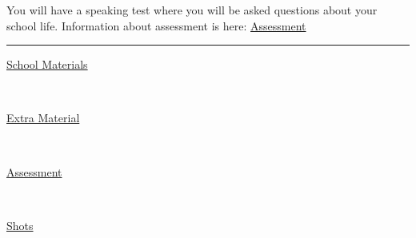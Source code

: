 \documentclass[11pt]{article}
\begin{document}
You will have a speaking test where you will be asked questions about your school life. Information about assessment is here: \href{https://sendagirich.github.io/assessment.html}{Assessment}

\noindent\rule{\textwidth}{0.5pt}

\begin{HTML}
\href{https://sendagirich.github.io/school-project/school\_materials.html}{School Materials}
\begin{center}
\begin{tabular}{}
\\\empty
\end{tabular}
\end{center}
\href{https://sendagirich.github.io/school-project/extra\_materials.html}{Extra Material}
\begin{center}
\begin{tabular}{}
\\\empty
\end{tabular}
\end{center}
\href{https://sendagirich.github.io/school-project/assessment.html}{Assessment}
\begin{center}
\begin{tabular}{}
\\\empty
\end{tabular}
\end{center}
\href{https://sendagirich.github.io/school-project/shots.html}{Shots}
\end{HTML}
\end{document}
